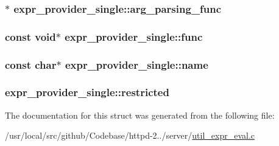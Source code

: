 \subsubsection[{\texorpdfstring{arg\+\_\+parsing\+\_\+func}{arg_parsing_func}}]{$\ast$ expr\+\_\+provider\+\_\+single\+::arg\+\_\+parsing\+\_\+func}\hypertarget{structexpr__provider__single_af3f06e7a02fed423a9efec17bdbba7f2}{}\label{structexpr__provider__single_af3f06e7a02fed423a9efec17bdbba7f2}
\subsubsection[{\texorpdfstring{func}{func}}]{\setlength{\rightskip}{0pt plus 5cm}const {\bf void}$\ast$ expr\+\_\+provider\+\_\+single\+::func}\hypertarget{structexpr__provider__single_aa66257e8ff4f73f3ee1fc5a841e2d772}{}\label{structexpr__provider__single_aa66257e8ff4f73f3ee1fc5a841e2d772}
\subsubsection[{\texorpdfstring{name}{name}}]{\setlength{\rightskip}{0pt plus 5cm}const char$\ast$ expr\+\_\+provider\+\_\+single\+::name}\hypertarget{structexpr__provider__single_a4d101e028d2ea3587c6fb8b0375d5f9b}{}\label{structexpr__provider__single_a4d101e028d2ea3587c6fb8b0375d5f9b}
\subsubsection[{\texorpdfstring{restricted}{restricted}}]{ expr\+\_\+provider\+\_\+single\+::restricted}\hypertarget{structexpr__provider__single_a50994346633fce0e53a1a9d76c7f81e0}{}\label{structexpr__provider__single_a50994346633fce0e53a1a9d76c7f81e0}


The documentation for this struct was generated from the following file\+:\begin{DoxyCompactItemize}
\item 
/usr/local/src/github/\+Codebase/httpd-\/2../server/\hyperlink{util__expr__eval_8c}{util\+\_\+expr\+\_\+eval.\+c}\end{DoxyCompactItemize}
